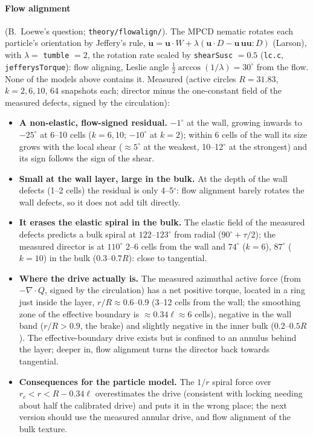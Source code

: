 \paragraph{Flow alignment} (B.~Loewe's question; \texttt{theory/flowalign/}). The MPCD nematic rotates each particle's orientation by Jeffery's rule,
$\dot{\mathbf u}=\mathbf u\cdot W+\lambda(\mathbf u\cdot D-\mathbf u\,\mathbf u\mathbf u\!:\!D)$ (Larson), with $\lambda=$ \texttt{tumble} $=2$, the rotation rate scaled
by \texttt{shearSusc} $=0.5$ (\texttt{lc.c}, \texttt{jefferysTorque}): flow aligning, Leslie angle $\tfrac12\arccos(1/\lambda)=30^\circ$ from the flow. None of the models
above contains it. Measured (active circles $R=31.83$, $k=2,6,10$, 64 snapshots each; director minus the one-constant field of the measured defects, signed by
the circulation):
\begin{itemize}
  \item \textbf{A non-elastic, flow-signed residual.} $-1^\circ$ at the wall, growing inwards to $-25^\circ$ at 6--10 cells ($k=6,10$; $-10^\circ$ at $k=2$); within 6 cells
        of the wall its size grows with the local shear ($\approx5^\circ$ at the weakest, 10--12$^\circ$ at the strongest) and its sign follows the sign of the shear.
  \item \textbf{Small at the wall layer, large in the bulk.} At the depth of the wall defects (1--2 cells) the residual is only 4--5$^\circ$: flow alignment barely rotates
        the wall defects, so it does not add tilt directly.
  \item \textbf{It erases the elastic spiral in the bulk.} The elastic field of the measured defects predicts a bulk spiral at $122$--$123^\circ$ from radial ($90^\circ+\tau/2$);
        the measured director is at $110^\circ$ 2--6 cells from the wall and $74^\circ$ ($k=6$), $87^\circ$ ($k=10$) in the bulk ($0.3$--$0.7R$): close to tangential.
  \item \textbf{Where the drive actually is.} The measured azimuthal active force (from $-\nabla\!\cdot Q$, signed by the circulation) has a net positive torque, located in a
        ring just inside the layer, $r/R\approx0.6$--0.9 (3--12 cells from the wall; the smoothing zone of the effective boundary is $\approx0.34\ell\approx6$ cells), negative
        in the wall band ($r/R>0.9$, the brake) and slightly negative in the inner bulk ($0.2$--$0.5R$). The effective-boundary drive exists but is confined to an
        annulus behind the layer; deeper in, flow alignment turns the director back towards tangential.
  \item \textbf{Consequences for the particle model.} The $1/r$ spiral force over $r_c<r<R-0.34\ell$ overestimates the drive (consistent with locking needing about half the
        calibrated drive) and puts it in the wrong place; the next version should use the measured annular drive, and flow alignment of the bulk texture.
\end{itemize}

